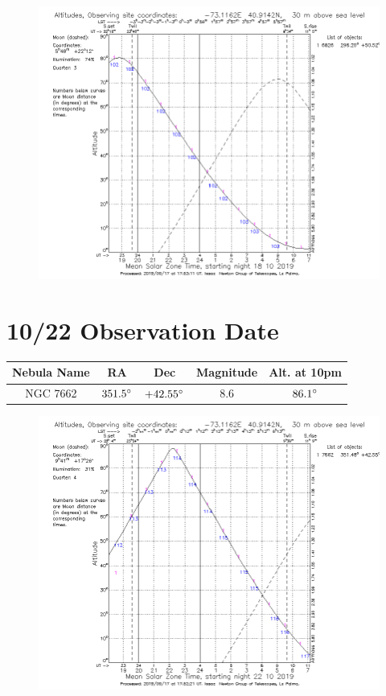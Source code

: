 \documentclass{article}[12pt]
\begin{document}
\begin{figure}[h]
	\includegraphics[width=\linewidth]{NGC6826_10_18.pdf}
\end{figure}

\newpage

\section{10/22 Observation Date}

\begin{table}[h]
	\begin{center}
		\begin{tabular}{|c | c | c | c | c |}
			\hline
			Nebula Name & RA & Dec & Magnitude & Alt. at 10pm \\
			\hline
			\hline
			NGC 7662 & $351.5\degree$ & $+42.55\degree$ & 8.6 & $86.1\degree$\\
			\hline
		\end{tabular}
	\end{center}
\end{table}

\begin{figure}[h]
	\includegraphics[width=\linewidth]{NGC7662_10_22.pdf}
\end{figure}
\end{document}
